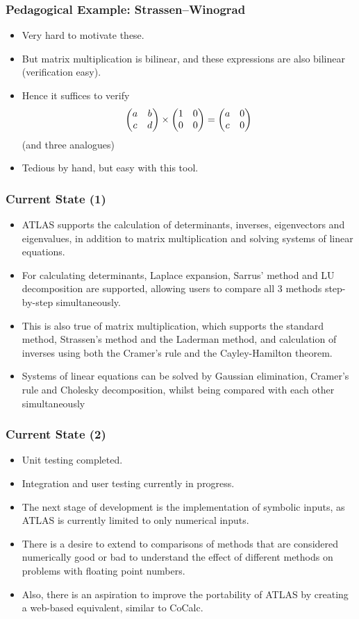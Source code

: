 \begin{frame}%
\frametitle{Pedagogical Example: Strassen--Winograd}\pause
\begin{itemize}[<+->]
\item Very hard to motivate these.
\item But matrix multiplication is bilinear, and these expressions are also bilinear (verification easy).
\item Hence it suffices to verify
$$
\begin{pmatrix}
a&b\cr c&d
\end{pmatrix}\times
\begin{pmatrix}
1&0\cr0&0
\end{pmatrix}
=\begin{pmatrix}
a&0\cr c&0
\end{pmatrix}
$$
(and three analogues)
\item Tedious by hand, but easy with this tool.
\end{itemize}
\end{frame}

\begin{frame}%
\frametitle{Current State (1)}\pause
\begin{itemize}[<+->]
\item ATLAS supports the calculation of determinants, inverses, eigenvectors and eigenvalues, in addition to matrix multiplication and solving systems of linear equations.
\item For calculating determinants, Laplace expansion, Sarrus' method and LU decomposition are supported, allowing users to compare all 3 methods step-by-step simultaneously.
\item This is also true of matrix multiplication, which supports the standard method, Strassen's method and the Laderman method, and calculation of inverses using both the Cramer's rule and the Cayley-Hamilton theorem.
\item Systems of linear equations can be solved by Gaussian elimination, Cramer's rule and Cholesky decomposition, whilst being compared with each other simultaneously
\end{itemize}
\end{frame}

\begin{frame}%
\frametitle{Current State (2)}\pause
\begin{itemize}[<+->]
\item Unit testing completed.
\item Integration and user testing currently in progress.
\item The next stage of development is the implementation of symbolic inputs, as ATLAS is currently limited to only numerical inputs.
\item There is a desire to extend to comparisons of methods that are considered numerically good or bad to understand the effect of different methods on problems with floating point numbers.
\item Also, there is an aspiration to improve the portability of ATLAS by creating a web-based equivalent, similar to CoCalc.
\end{itemize}
\end{frame}

